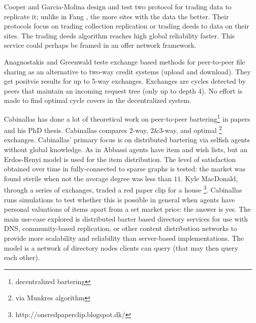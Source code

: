 \documentclass[main.tex]{subfiles}
\begin{document}
Cooper and Garcia-Molina \cite{Coo1} design and test two protocol for trading data to replicate it; unlike in Fang \cite{Fang}, the more sites with the data the better. Their protocols focus on trading collection replication or trading deeds to data on their sites. The trading deeds algorithm reaches high global reliability faster. This service could perhaps be framed in an offer network framework.

Anagnostakis and Greenwald \cite{Ana1} teste exchange based methods for peer-to-peer file sharing as an alternative to two-way credit systems (upload and download). They get positvie results for up to 5-way exchanges. Exchanges are cycles detected by peers that maintain an incoming request tree (only up to depth 4). No effort is made to find optimal cycle covers in the decentralized system.

Cabinallas \cite{Cab0} \cite{Cab1} has done a lot of theoretical work on peer-to-peer bartering\footnote{decentralized bartering} in papers and his PhD thesis. Cabinallas compares 2-way, 2\&3-way, and optimal \footnote{via Munkres algorithm} exchanges. Cabinallas' primary focus is on distributed bartering via selfish agents without global knowledge. As in Abbassi \cite{Abb1} \cite{Abb2} agents have item and wish lists, but an Erdos-Renyi model is used for the item distribution. The level of satisfaction obtained over time in fully-connected to sparse graphs is tested: the market was found sterile when not the average degree was less than $11$. Kyle MacDonald, through a series of exchanges, traded a red paper clip for a house \footnote{http://oneredpaperclip.blogspot.dk/}. Cabinallas runs simulations to test whether this is possible in general when agents have personal valuations of items apart from a set market price: the answer is yes. The main use-case explored is distributed barter based directory services for use with DNS, community-based replication, or other content distribution networks to provide more scalability and reliability than server-based implementations. The model is a network of directory nodes clients can query (that may then query each other).
\end{document}
